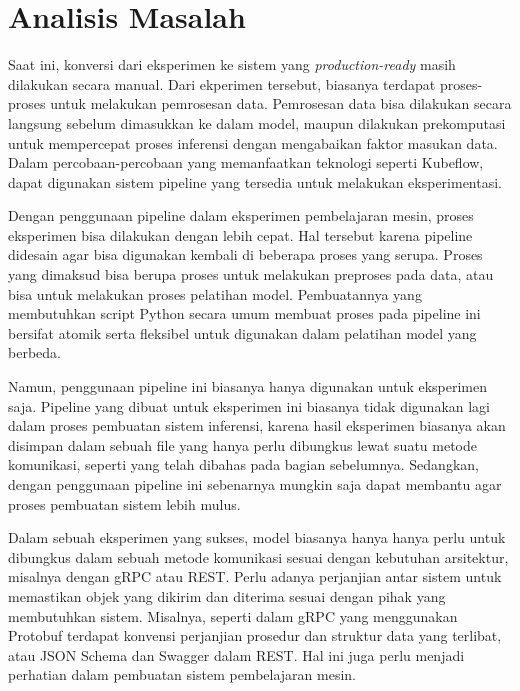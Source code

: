 \section{Analisis Masalah}

Saat ini, konversi dari eksperimen ke sistem yang \textit{production-ready} masih dilakukan secara manual.
Dari ekperimen tersebut, biasanya terdapat proses-proses untuk melakukan pemrosesan data.
Pemrosesan data bisa dilakukan secara langsung sebelum dimasukkan ke dalam model, maupun dilakukan prekomputasi untuk mempercepat proses inferensi dengan mengabaikan faktor masukan data.
Dalam percobaan-percobaan yang memanfaatkan teknologi seperti Kubeflow, dapat digunakan sistem pipeline yang tersedia untuk melakukan eksperimentasi.

Dengan penggunaan pipeline dalam eksperimen pembelajaran mesin, proses eksperimen bisa dilakukan dengan lebih cepat.
Hal tersebut karena pipeline didesain agar bisa digunakan kembali di beberapa proses yang serupa.
Proses yang dimaksud bisa berupa proses untuk melakukan preproses pada data, atau bisa untuk melakukan proses pelatihan model.
Pembuatannya yang membutuhkan script Python secara umum membuat proses pada pipeline ini bersifat atomik serta fleksibel untuk digunakan dalam pelatihan model yang berbeda.

Namun, penggunaan pipeline ini biasanya hanya digunakan untuk eksperimen saja.
Pipeline yang dibuat untuk eksperimen ini biasanya tidak digunakan lagi dalam proses pembuatan sistem inferensi, karena hasil eksperimen biasanya akan disimpan dalam sebuah file yang hanya perlu dibungkus lewat suatu metode komunikasi, seperti yang telah dibahas pada bagian sebelumnya.
Sedangkan, dengan penggunaan pipeline ini sebenarnya mungkin saja dapat membantu agar proses pembuatan sistem lebih mulus.

Dalam sebuah eksperimen yang sukses, model biasanya hanya hanya perlu untuk dibungkus dalam sebuah metode komunikasi sesuai dengan kebutuhan arsitektur, misalnya dengan gRPC atau REST.\@
Perlu adanya perjanjian antar sistem untuk memastikan objek yang dikirim dan diterima sesuai dengan pihak yang membutuhkan sistem.
Misalnya, seperti dalam gRPC yang menggunakan Protobuf terdapat konvensi perjanjian prosedur dan struktur data yang terlibat, atau JSON Schema dan Swagger dalam REST.\@
Hal ini juga perlu menjadi perhatian dalam pembuatan sistem pembelajaran mesin.
